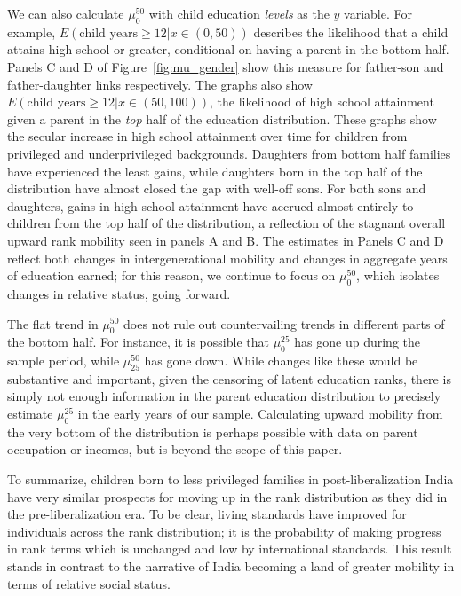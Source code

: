 \documentclass[12pt,letterpaper]{article}
\numberwithin{equation}{section}
\begin{document}
We can also calculate $\mu_0^{50}$ with child education \textit{levels} as the $y$ variable. For example, $E(\text{child years} \geq 12 | x \in (0, 50))$ describes the likelihood that a child attains high school or greater, conditional on having a parent in the bottom half.  Panels C and D of Figure~\ref{fig:mu_gender} show this measure for father-son and father-daughter links respectively.  The graphs also show $E(\text{child years} \geq 12 | x \in (50, 100))$, the likelihood of high school attainment given a parent in the \textit{top} half of the education distribution. These graphs show the secular increase in high school attainment over time for children from privileged and underprivileged backgrounds. Daughters from bottom half families have experienced the least gains, while daughters born in the top half of the distribution have almost closed the gap with well-off sons. For both sons and daughters, gains in high school attainment have accrued almost entirely to children from the top half of the distribution, a reflection of the stagnant overall upward rank mobility seen in panels A and B. The estimates in Panels C and D reflect both changes in intergenerational mobility and changes in aggregate years of education earned; for this reason, we continue to focus on $\mu_0^{50}$, which isolates changes in relative status, going forward.

The flat trend in $\mu_0^{50}$ does not rule out countervailing trends in different parts of the bottom half. For instance, it is possible that $\mu_0^{25}$ has gone up during the sample period, while $\mu_{25}^{50}$ has gone down. While changes like these would be substantive and important, given the censoring of latent education ranks, there is simply not enough information in the parent education distribution to precisely estimate $\mu_0^{25}$ in the early years of our sample. Calculating upward mobility from the very bottom of the distribution is perhaps possible with data on parent occupation or incomes, but is beyond the scope of this paper.

To summarize, children born to less privileged families in post-liberalization India have very similar prospects for moving up in the rank distribution as they did in the pre-liberalization era. To be clear, living standards have improved for individuals across the rank distribution; it is the probability of making progress in rank terms which is unchanged and low by international standards.  This result stands in contrast to the narrative of India becoming a land of greater mobility in terms of relative social status.
\end{document}
